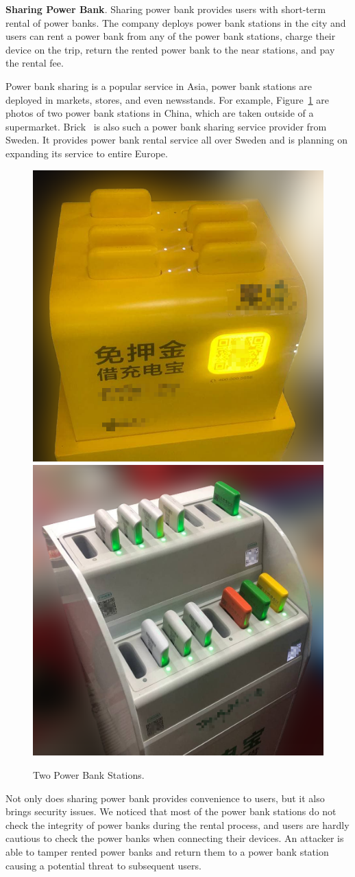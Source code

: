 \textbf{Sharing Power Bank}.  Sharing power bank provides users with short-term
rental of power banks.  The company deploys power bank stations in the city and
users can rent a power bank from any of the power bank stations, charge their
device on the trip, return the rented power bank to the near stations, and pay
the rental fee.

Power bank sharing is a popular service in Asia, power bank stations are deployed
in markets, stores, and even newsstands. For example, Figure~\ref{fig:PBS_products} are photos
of two power bank stations in China, which are taken outside of a supermarket. Brick~\cite{Brick} is also such a power bank sharing service provider from
Sweden. It provides power bank rental service all over Sweden and is planning on expanding its
service to entire Europe.
\begin{figure}[t]
	\centering
	\includegraphics[width=.45 \linewidth, height=.45 \linewidth]{./Figs/PBS_mt.png}
	\includegraphics[width=.45 \linewidth, height=.45 \linewidth]{./Figs/PBS_xd.png}
	\caption{Two Power Bank Stations.}
	\label{fig:PBS_products}
\end{figure}


Not only does sharing power bank provides convenience to users, but it also
brings security issues.  We noticed that most of the power bank stations do not
check the integrity of power banks during the rental process, and users are
hardly cautious to check the power banks when connecting their devices.  An
attacker is able to tamper rented power banks and return them to a power bank
station causing a potential threat to subsequent users.


